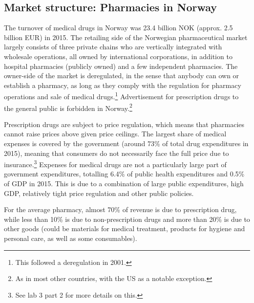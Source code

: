 \documentclass[12pt,a4paper]{article}
\begin{document}
\subsection*{Market structure: Pharmacies in Norway}
The turnover of medical drugs in Norway was 23.4 billion NOK (approx. 2.5 billion EUR) in 2015. The retailing side of the Norwegian pharmaceutical market largely consists of three private chains who are vertically integrated with wholesale operations, all owned by international corporations, in addition to hospital pharmacies (publicly owned) and a few independent pharmacies. The owner-side of the market is deregulated, in the sense that anybody can own or establish a pharmacy, as long as they comply with the regulation for pharmacy operations and sale of medical drugs.\footnote{This followed a deregulation in 2001.} Advertisement for prescription drugs to the general public is forbidden in Norway.\footnote{As in most other countries, with the US as a notable exception.}

Prescription drugs are subject to price regulation, which means that pharmacies cannot raise prices above given price ceilings. The largest share of medical expenses is covered by the government (around 73\% of total drug expenditures in 2015), meaning that consumers do not necessarily face the full price due to insurance.\footnote{See lab 3 part 2 for more details on this.} Expenses for medical drugs are not a particularly large part of government expenditures, totalling 6.4\% of public health expenditures and 0.5\% of GDP in 2015. This is due to a combination of large public expenditures, high GDP, relatively tight price regulation and other public policies.

For the average pharmacy, almost 70\% of revenue is due to prescription drug, while less than 10\% is due to non-prescription drugs and more than 20\% is due to other goods (could be materials for medical treatment, products for hygiene and personal care, as well as some consumables).

\pagebreak
\end{document}
